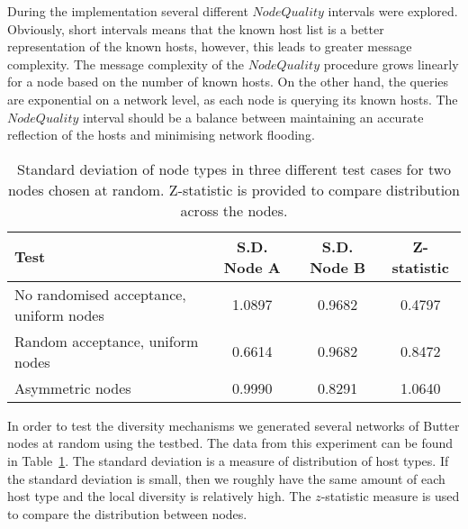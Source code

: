 During the implementation several different $NodeQuality$ intervals were explored. Obviously, short intervals means that the known host list is a better representation of the known hosts, however, this leads to greater message complexity. The message complexity of the $NodeQuality$ procedure grows linearly for a node based on the number of known hosts. On the other hand, the queries are exponential on a network level, as each node is querying its known hosts. The $NodeQuality$ interval should be a balance between maintaining an accurate reflection of the hosts and minimising network flooding.


\begin{table}[h]
    \centering
    \begin{tabular}{|l|c|c|c|}
        \hline
        \textbf{Test} & \textbf{S.D. Node A} & \textbf{S.D. Node B} & \textbf{Z-statistic} \\
        \hline
        No randomised acceptance, uniform nodes &  1.0897 & 0.9682 & 0.4797 \\
        Random acceptance, uniform nodes & 0.6614 & 0.9682 & 0.8472 \\
        Asymmetric nodes & 0.9990 &  0.8291 & 1.0640 \\
        \hline
    \end{tabular}
    \caption{Standard deviation of node types in three different test cases for two nodes chosen at random. Z-statistic is provided to compare distribution across the nodes.}
    \label{tab:diversityData}
\end{table}

In order to test the diversity mechanisms we generated several networks of Butter nodes at random using the testbed. The data from this experiment can be found in Table~\ref{tab:diversityData}. The standard deviation is a measure of distribution of host types. If the standard deviation is small, then we roughly have the same amount of each host type and the local diversity is relatively high. The $z$-statistic measure is used to compare the distribution between nodes.


